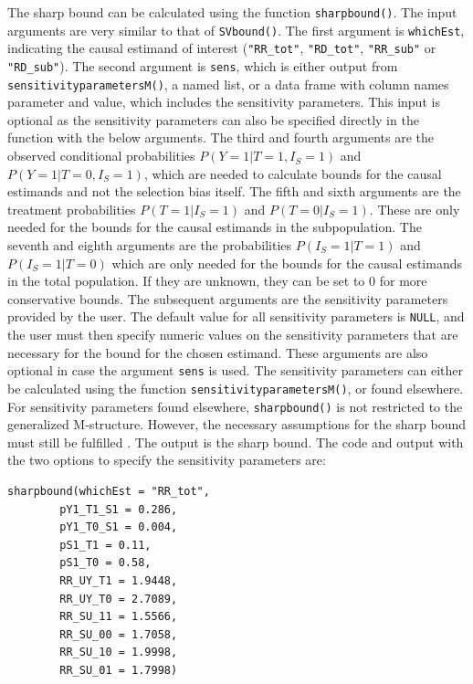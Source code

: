 The sharp bound can be calculated using the function \texttt{sharpbound()}. The input
arguments are very similar to that of \texttt{SVbound()}. The first argument is
\texttt{whichEst}, indicating the causal estimand of interest (\texttt{"RR\_tot"},
\texttt{"RD\_tot"}, \texttt{"RR\_sub"} or \texttt{"RD\_sub"}). The second argument is \texttt{sens}, which is
either output from \texttt{sensitivityparametersM()}, a named list, or a data frame with
column names parameter and value, which includes the sensitivity parameters.
This input is optional as the sensitivity parameters can also be specified
directly in the function with the below arguments. The third and fourth arguments
are the observed conditional probabilities \(P(Y=1|T=1,I_S=1)\) and
\(P(Y=1|T=0,I_S=1)\), which are needed to calculate bounds for the causal
estimands and not the selection bias itself. The fifth and sixth
arguments are the treatment probabilities \(P(T=1|I_S=1)\) and \(P(T=0|I_S=1)\).
These are only needed for the bounds for the causal estimands in the
subpopulation. The seventh and eighth arguments are the probabilities
\(P(I_S=1|T=1)\) and \(P(I_S=1|T=0)\) which are only needed for the bounds for the
causal estimands in the total population. If they are unknown, they can be set
to 0 for more conservative bounds. The subsequent arguments are the
sensitivity parameters provided by the user. The default value for all
sensitivity parameters is \texttt{NULL}, and the user must then specify numeric values
on the sensitivity parameters that are necessary for the bound for the chosen
estimand. These arguments are also optional in case the argument \texttt{sens} is used.
The sensitivity parameters can either be calculated using the function
\texttt{sensitivityparametersM()}, or found elsewhere. For sensitivity parameters found
elsewhere, \texttt{sharpbound()} is not restricted to the generalized M-structure.
However, the necessary assumptions for the sharp bound must still be fulfilled
\citep{zetterstrom2025investigations}. The output is the sharp bound. The code and
output with the two options to specify the sensitivity parameters are:

\begin{verbatim}
sharpbound(whichEst = "RR_tot",
        pY1_T1_S1 = 0.286,
        pY1_T0_S1 = 0.004,
        pS1_T1 = 0.11,
        pS1_T0 = 0.58,
        RR_UY_T1 = 1.9448,
        RR_UY_T0 = 2.7089,
        RR_SU_11 = 1.5566,
        RR_SU_00 = 1.7058,
        RR_SU_10 = 1.9998,
        RR_SU_01 = 1.7998)
\end{verbatim}

